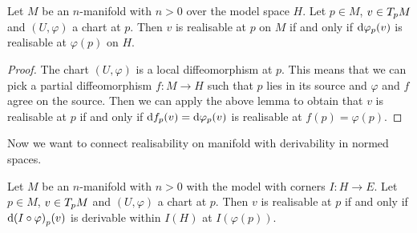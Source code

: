 \begin{cor}\label{cor:invariantUnderChartsRealisable}
Let $M$ be an $n$-manifold with $n > 0$ over the model space $H$. Let $p \in M$, $v \in T_{p}M$ and $(U, \varphi)$ a chart at $p$. 
Then $v$ is realisable at $p$ on $M$ if and only if $\text{d}{\varphi}_{p}(v)$ is realisable at $\varphi(p)$ on $H$. 
\end{cor}

\begin{proof}
The chart $(U, \varphi)$ is a local diffeomorphism at $p$. This means that we can pick a partial diffeomorphism $f \colon M \to H$ such that $p$ lies in its source and $\varphi$ and $f$ agree on the source. Then we can apply the above lemma to obtain that $v$ is realisable at $p$ if and only if $\text{d}{f}_{p}(v) = \text{d}{\varphi}_{p}(v)$ is realisable at $f(p) = \varphi(p)$.
\end{proof}

Now we want to connect realisability on manifold with derivability in normed spaces. 

\begin{lem}\label{lem:reduceNormedSpaceDerivable}
Let $M$ be an $n$-manifold with $n > 0$ with the model with corners $I \colon H \to E$.  
Let $p \in M$, $v \in T_{p}M$ and $(U, \varphi)$ a chart at $p$. 
Then $v$ is realisable at $p$ if and only if $\text{d}{(I \circ \varphi)}_{p}(v)$ is derivable within $I(H)$ at $I(\varphi(p))$.
\end{lem}

